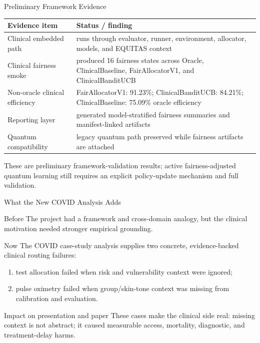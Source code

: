 \documentclass[aspectratio=169,10pt]{beamer}
\begin{document}
\begin{frame}{Preliminary Framework Evidence}
\begin{center}
\begin{tabular}{p{}p{}}
\toprule
Evidence item & Status / finding \\
\midrule
Clinical embedded path & runs through evaluator, runner, environment, allocator, models, and EQUITAS context \\
Clinical fairness smoke & produced 16 fairness states across Oracle, ClinicalBaseline, FairAllocatorV1, and ClinicalBanditUCB \\
Non-oracle clinical efficiency & FairAllocatorV1: 91.23\%; ClinicalBanditUCB: 84.21\%; ClinicalBaseline: 75.09\% oracle efficiency \\
Reporting layer & generated model-stratified fairness summaries and manifest-linked artifacts \\
Quantum compatibility & legacy quantum path preserved while fairness artifacts are attached \\
\bottomrule
\end{tabular}
\end{center}

\vspace{0.4em}
\small These are preliminary framework-validation results; active fairness-adjusted quantum learning still requires an explicit policy-update mechanism and full validation.
\end{frame}

\begin{frame}{What the New COVID Analysis Adds}
\begin{block}{Before}
The project had a framework and cross-domain analogy, but the clinical motivation needed stronger empirical grounding.
\end{block}

\begin{block}{Now}
The COVID case-study analysis supplies two concrete, evidence-backed clinical routing failures:
\begin{enumerate}
    \item test allocation failed when risk and vulnerability context were ignored;
    \item pulse oximetry failed when group/skin-tone context was missing from calibration and evaluation.
\end{enumerate}
\end{block}

\begin{block}{Impact on presentation and paper}
These cases make the clinical side real: missing context is not abstract; it caused measurable access, mortality, diagnostic, and treatment-delay harms.
\end{block}
\end{frame}
\end{document}
